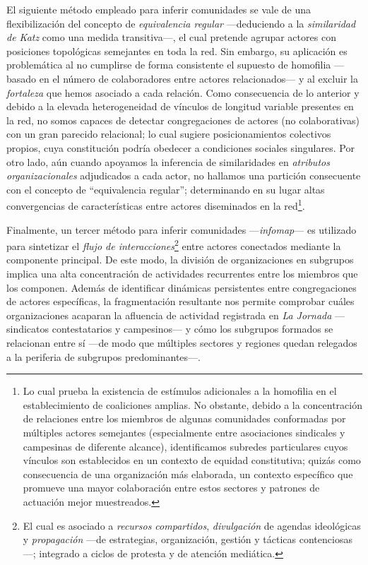 \documentclass[letterpaper, 11pt]{book}
\theoremstyle{definition}
\theoremstyle{remark}
\begin{document}
El siguiente método empleado para inferir comunidades se vale de una flexibilización del concepto de \emph{equivalencia regular} ---deduciendo a la \emph{similaridad de Katz} como una medida transitiva---, el cual pretende agrupar actores con posiciones topológicas semejantes en toda la red. 
Sin embargo, su aplicación es problemática al no cumplirse de forma consistente el supuesto de homofilia ---basado en el número de colaboradores entre actores relacionados--- y al excluir la \emph{fortaleza} que hemos asociado a cada relación. 
Como consecuencia de lo anterior y debido a la elevada heterogeneidad de vínculos de longitud variable presentes en la red, no somos capaces de detectar congregaciones de actores (no colaborativas) con un gran parecido relacional; lo cual sugiere posicionamientos colectivos propios, cuya constitución podría obedecer a condiciones sociales singulares. 
Por otro lado, aún cuando apoyamos la inferencia de similaridades en \emph{atributos organizacionales} adjudicados a cada actor, no hallamos una partición consecuente con el concepto de ``equivalencia regular''; determinando en su lugar altas convergencias de características entre actores diseminados en la red\footnote{
    Lo cual prueba la existencia de estímulos adicionales a la homofilia en el establecimiento de coaliciones amplias. 
    No obstante, debido a la concentración de relaciones entre los miembros de algunas comunidades conformadas por múltiples actores semejantes (especialmente entre asociaciones sindicales y campesinas de diferente alcance), identificamos subredes particulares cuyos vínculos son establecidos en un contexto de equidad constitutiva; quizás como consecuencia de una organización más elaborada, un contexto específico que promueve una mayor colaboración entre estos sectores y patrones de actuación mejor muestreados. 
}. 


Finalmente, un tercer método para inferir comunidades ---\emph{infomap}--- es utilizado para sintetizar el \emph{flujo de interacciones}\footnote{
    El cual es asociado a \emph{recursos compartidos}, \emph{divulgación} de agendas ideológicas y \emph{propagación} ---de estrategias, organización, gestión y tácticas contenciosas---; integrado a ciclos de protesta y de atención mediática. 
} 
entre actores conectados mediante la componente principal. 
De este modo, la división de organizaciones en subgrupos implica una alta concentración de actividades recurrentes entre los miembros que los componen. 
Además de identificar dinámicas persistentes entre congregaciones de actores específicas, la fragmentación resultante nos permite comprobar cuáles organizaciones acaparan la afluencia de actividad registrada en \emph{La Jornada} ---sindicatos contestatarios y campesinos--- y cómo los subgrupos formados se relacionan entre sí ---de modo que múltiples sectores y regiones quedan relegados a la periferia de subgrupos predominantes---.
\end{document}
